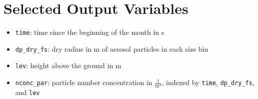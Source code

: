 \section{Selected Output Variables}

\begin{itemize}
    \item \texttt{time}: time since the beginning of the month in $\text{s}$
    \item \texttt{dp\_dry\_fs}: dry radius in $\text{m}$ of aerosol particles in each size bin
    \item \texttt{lev}: height above the ground in $\text{m}$
    \item \texttt{nconc\_par}: particle number concentration in $\frac{1}{\text{m}^3}$, indexed by \texttt{time}, \texttt{dp\_dry\_fs}, and \texttt{lev}
\end{itemize}
